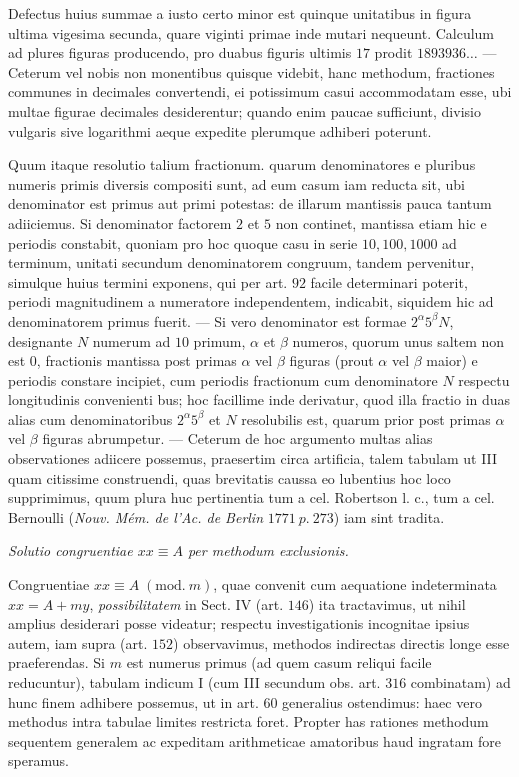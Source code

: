 Defectus huius summae a iusto certo minor est quinque unitatibus in figura ultima vigesima secunda, quare viginti primae inde mutari nequeunt. Calculum ad plures figuras producendo, pro duabus figuris ultimis \(17\) prodit \(1893936\ldots\) — Ceterum vel nobis non monentibus quisque videbit, hanc methodum, fractiones communes in decimales convertendi, ei potissimum casui accommodatam esse, ubi multae figurae decimales desiderentur; quando enim paucae sufficiunt, divisio vulgaris sive logarithmi aeque expedite plerumque adhiberi poterunt.

Quum itaque resolutio talium fractionum. quarum denominatores e pluribus numeris primis diversis compositi sunt, ad eum casum iam reducta sit, ubi denominator est primus aut primi potestas: de illarum mantissis pauca tantum adiiciemus. Si denominator factorem \(2\) et \(5\) non continet, mantissa etiam hic e periodis constabit, quoniam pro hoc quoque casu in serie \(10,\allowbreak 100,\allowbreak 1000\) ad terminum, unitati secundum denominatorem congruum, tandem pervenitur, simulque huius termini exponens, qui per art. \(92\) facile determinari poterit, periodi magnitudinem a numeratore independentem, indicabit, siquidem hic ad denominatorem primus fuerit. — Si vero denominator est formae \(2^\alpha5^\beta N\), designante \(N\) numerum ad \(10\) primum, \(\alpha\) et \(\beta\) numeros, quorum unus saltem non est \(0\), fractionis mantissa post primas \(\alpha\) vel \(\beta\) figuras (prout \(\alpha\) vel \(\beta\) maior) e periodis constare incipiet, cum periodis fractionum cum denominatore \(N\) respectu longitudinis convenienti%
bus; hoc facillime inde derivatur, quod illa fractio in duas alias cum denominatoribus \(2^\alpha5^\beta\) et \(N\) resolubilis est, quarum prior post primas \(\alpha\) vel \(\beta\) figuras abrumpetur. — Ceterum de hoc argumento multas alias observationes adiicere possemus, praesertim circa artificia, talem tabulam ut III quam citissime construendi, quas brevitatis caussa eo lubentius hoc loco supprimimus, quum plura huc pertinentia tum a cel. Robertson l. c., tum a cel. Bernoulli (\textit{Nouv. Mém. de l'Ac. de Berlin} \(1771\ p.\ 273\)) iam sint tradita.

\begin{center}\textit{Solutio congruentiae \(xx\equiv A\) per methodum exclusionis.}\end{center}


Congruentiae \(xx\equiv A\; (\mathrm{mod}.\ m)\), quae convenit cum aequatione indeterminata \(xx=A+my\), \textit{possibilitatem} in Sect. IV (art. \(146\)) ita tractavimus, ut nihil amplius desiderari posse videatur; respectu investigationis incognitae ipsius autem, iam supra (art. \(152\)) observavimus, methodos indirectas directis longe esse praeferendas. Si \(m\) est numerus primus (ad quem casum reliqui facile reducuntur), tabulam indicum I (cum III secundum obs. art. \(316\) combinatam) ad hunc finem adhibere possemus, ut in art. \(60\) generalius ostendimus: haec vero methodus intra tabulae limites restricta foret. Propter has rationes methodum sequentem generalem ac expeditam arithmeticae amatoribus haud ingratam fore speramus.


